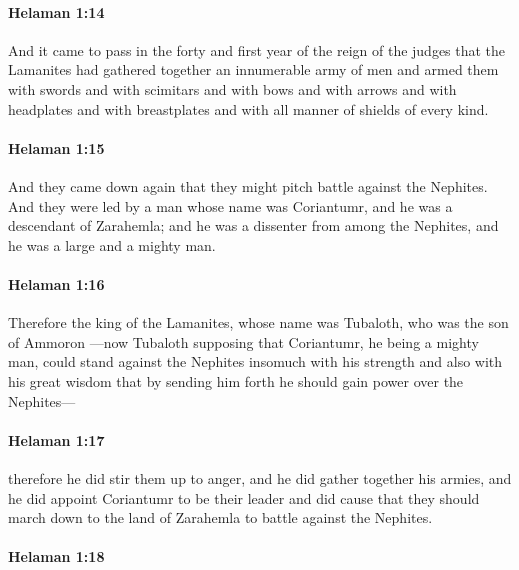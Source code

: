 		\paragraph{Helaman 1:14} %
			\label{HELAMAN-1-14}

			And it came to pass in the forty and first year of the reign of the judges
			that the Lamanites had gathered together an innumerable army of men
			and armed them with swords and with scimitars
			and with bows and with arrows
			and with headplates and with breastplates
			and with all manner of shields of every kind.

		\paragraph{Helaman 1:15} %
			\label{HELAMAN-1-15}

			And they came down again that they might pitch battle against the Nephites.
			And they were led by a man whose name was Coriantumr,
			and he was a descendant of Zarahemla;
			and he was a dissenter from among the Nephites,
			and he was a large and a mighty man.

		\paragraph{Helaman 1:16} %
			\label{HELAMAN-1-16}

			Therefore the king of the Lamanites,
			whose name was Tubaloth, who was the son of Ammoron
			---now Tubaloth supposing that Coriantumr,
			he being a mighty man,
			could stand against the Nephites
			insomuch with his strength and also with his great wisdom
			that by sending him forth he should gain power over the Nephites---

		\paragraph{Helaman 1:17} %
			\label{HELAMAN-1-17}

			therefore he did stir them up to anger,
			and he did gather together his armies,
			and he did appoint Coriantumr to be their leader
			and did cause that they should march down to the land of Zarahemla
			to battle against the Nephites.

		\paragraph{Helaman 1:18} %
			\label{HELAMAN-1-18}


